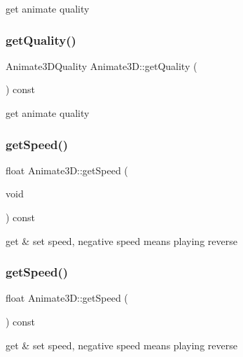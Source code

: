 get animate quality \mbox{\label{classAnimate3D_af9e4be0cb5896579154c7dd971315914}} 
\subsubsection{\texorpdfstring{get\+Quality()}{getQuality()}\hspace{0.1cm}{\footnotesize\ttfamily [2/2]}}
{\footnotesize\ttfamily Animate3\+D\+Quality Animate3\+D\+::get\+Quality (\begin{DoxyParamCaption}{ }\end{DoxyParamCaption}) const}

get animate quality \mbox{\label{classAnimate3D_a22cd253f8b3caf2d96e68c5ff7f833b4}} 
\subsubsection{\texorpdfstring{get\+Speed()}{getSpeed()}\hspace{0.1cm}{\footnotesize\ttfamily [1/2]}}
{\footnotesize\ttfamily float Animate3\+D\+::get\+Speed (\begin{DoxyParamCaption}\item[{void}]{ }\end{DoxyParamCaption}) const}

get \& set speed, negative speed means playing reverse \mbox{\label{classAnimate3D_a22cd253f8b3caf2d96e68c5ff7f833b4}} 
\subsubsection{\texorpdfstring{get\+Speed()}{getSpeed()}\hspace{0.1cm}{\footnotesize\ttfamily [2/2]}}
{\footnotesize\ttfamily float Animate3\+D\+::get\+Speed (\begin{DoxyParamCaption}{ }\end{DoxyParamCaption}) const}

get \& set speed, negative speed means playing reverse \mbox{\label{classAnimate3D_a50adc250e0012bd6fffc86763854360b}} 
